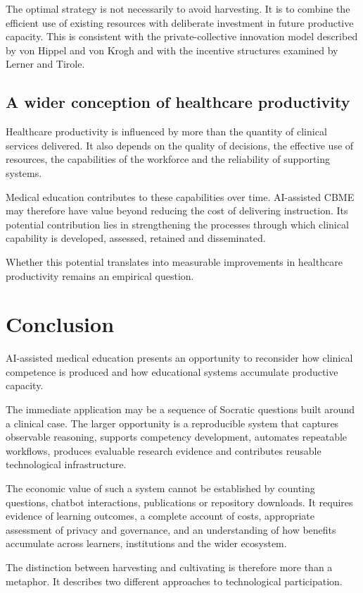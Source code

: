 \documentclass[11pt,a4paper]{article}
\begin{document}
The optimal strategy is not necessarily to avoid harvesting. It is to combine the efficient use of existing resources with deliberate investment in future productive capacity. This is consistent with the private-collective innovation model described by von Hippel and von Krogh and with the incentive structures examined by Lerner and Tirole.

\subsection{A wider conception of healthcare productivity}
Healthcare productivity is influenced by more than the quantity of clinical services delivered. It also depends on the quality of decisions, the effective use of resources, the capabilities of the workforce and the reliability of supporting systems.

Medical education contributes to these capabilities over time. AI-assisted CBME may therefore have value beyond reducing the cost of delivering instruction. Its potential contribution lies in strengthening the processes through which clinical capability is developed, assessed, retained and disseminated.

Whether this potential translates into measurable improvements in healthcare productivity remains an empirical question.

\section{Conclusion}
AI-assisted medical education presents an opportunity to reconsider how clinical competence is produced and how educational systems accumulate productive capacity.

The immediate application may be a sequence of Socratic questions built around a clinical case. The larger opportunity is a reproducible system that captures observable reasoning, supports competency development, automates repeatable workflows, produces evaluable research evidence and contributes reusable technological infrastructure.

The economic value of such a system cannot be established by counting questions, chatbot interactions, publications or repository downloads. It requires evidence of learning outcomes, a complete account of costs, appropriate assessment of privacy and governance, and an understanding of how benefits accumulate across learners, institutions and the wider ecosystem.

The distinction between harvesting and cultivating is therefore more than a metaphor. It describes two different approaches to technological participation.
\end{document}
